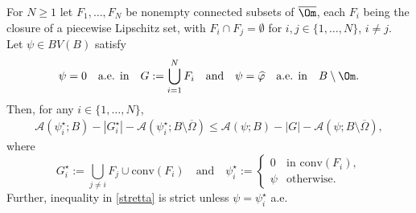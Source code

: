 \begin{lemma}
\label{lem:reduction_of_energy_I}
For $N\ge1$ let $F_1,\dots,F_N$ be
nonempty connected subsets of $\overline \Om$,
each $F_i$ being the closure of a piecewise Lipschitz
set, with $F_i \cap F_j= \emptyset$ for $i,j \in \{1,\dots,
N\}$, $i\neq j$.
Let $\psi\in BV(B)$ satisfy
\begin{equation}\label{eq:psi_0_union}
\psi=0\quad\text{a.e. in}\quad G:=\bigcup_{i=1}^NF_i\quad\text{and}\quad
\psi=\widehat{\varphi}\quad\text{a.e. in}\quad B\setminus{\Om}.
\end{equation}
Then, for any $i\in\{1,\dots,N\}$,
\begin{align}\label{stretta}
\mathcal A(\psi_i^\star;B)-|G_i^\star|-\mathcal A(\psi_i^\star;B\setminus \overline\Omega)\leq
\mathcal A(\psi;B)-|G|-\mathcal A(\psi;B\setminus \overline\Omega),
\end{align}
where
\begin{equation}\label{def:E_star,Psi_star}
G_i^\star:=\bigcup_{j\neq i}F_j\cup \mathrm{conv}(F_i)\quad\text{and}\quad
\psi_i^\star :=\begin{cases}
0&\text{in } \mathrm{conv}(F_i),\\
\psi&\text{otherwise.}
\end{cases}
\end{equation} Further, inequality in \eqref{stretta} is strict unless $\psi=\psi^\star_i$ a.e.
\end{lemma}

